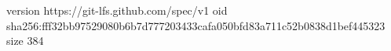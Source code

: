 version https://git-lfs.github.com/spec/v1
oid sha256:fff32bb97529080b6b7d777203433cafa050bfd83a711c52b0838d1bef445323
size 384
